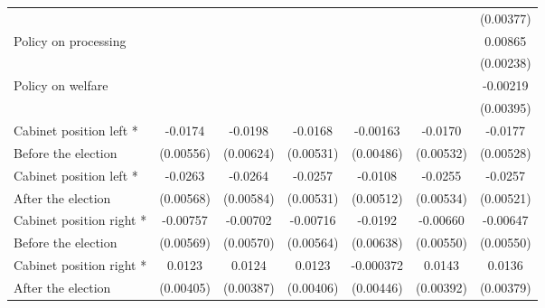 \begin{table}[!ht]
\begin{tabular}{l*{6}{c}}
                    &                     &                     &                     &                     &                     &   (0.00377)         \\
[0,5em]
Policy on processing&                     &                     &                     &                     &                     &     0.00865\sym{***}\\
                    &                     &                     &                     &                     &                     &   (0.00238)         \\
[0,5em]
Policy on welfare   &                     &                     &                     &                     &                     &    -0.00219         \\
                    &                     &                     &                     &                     &                     &   (0.00395)         \\
[0,5em]
Cabinet position left * &     -0.0174\sym{**} &     -0.0198\sym{**} &     -0.0168\sym{**} &    -0.00163         &     -0.0170\sym{**} &     -0.0177\sym{**} \\
Before the election                    &   (0.00556)         &   (0.00624)         &   (0.00531)         &   (0.00486)         &   (0.00532)         &   (0.00528)         \\
[0,5em]
Cabinet position left * &     -0.0263\sym{***}&     -0.0264\sym{***}&     -0.0257\sym{***}&     -0.0108\sym{*}  &     -0.0255\sym{***}&     -0.0257\sym{***}\\
After the election                    &   (0.00568)         &   (0.00584)         &   (0.00531)         &   (0.00512)         &   (0.00534)         &   (0.00521)         \\
[0,5em]
Cabinet position right * &    -0.00757         &    -0.00702         &    -0.00716         &     -0.0192\sym{**} &    -0.00660         &    -0.00647         \\
Before the election                    &   (0.00569)         &   (0.00570)         &   (0.00564)         &   (0.00638)         &   (0.00550)         &   (0.00550)         \\
[0,5em]
Cabinet position right *&      0.0123\sym{**} &      0.0124\sym{**} &      0.0123\sym{**} &   -0.000372         &      0.0143\sym{***}&      0.0136\sym{***}\\
 After the election                    &   (0.00405)         &   (0.00387)         &   (0.00406)         &   (0.00446)         &   (0.00392)         &   (0.00379)         \\

\end{tabular}
\end{table}
